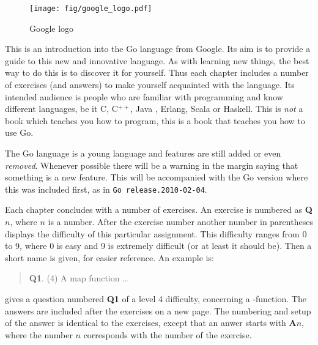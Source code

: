 \begin{wrapfigure}{r}{30mm}
\caption{Google logo}
\begin{center}
\texttt{[image: fig/google\_logo.pdf]}
\end{center}
\end{wrapfigure}
This is an introduction into the Go language from Google. Its aim
is to provide a guide to this new and innovative language. As with
learning new things, the best way to do this is to discover it for
yourself. Thus each chapter includes a number of exercises (and answers)
to make yourself acquainted with the language.
Its intended audience is people who are familiar with programming
and know different languages, be it C\cite{c}, C$^{++}$\cite{c++}, 
Java \cite{java}, Erlang\cite{erlang}, Scala\cite{scala} or
Haskell\cite{haskell}. This is \emph{not} a book which teaches you how to 
program, this is a book that teaches you how to use Go.

\begin{lbar}
\noindent The Go language is a young language and
features are still added or even \emph{removed}. Whenever
possible there will be a warning in the margin saying that
something is a new feature. This will be accompanied with
the Go version where this was included first, as in
\texttt{\tiny{}Go release.2010-02-04}.
\end{lbar}

Each chapter concludes with a number of exercises. An exercise
is numbered as \textbf{Q$n$}, where $n$ is a number. After the
exercise number another number in parentheses displays the difficulty
of this particular assignment. This difficulty ranges from 0 to 9, where
0 is easy and 9 is extremely difficult (or at least it should be).
Then a short name is given, for easier reference.
An example is:
\begin{verse}
\textbf{Q1}. (4) A map function \ldots
\end{verse}
    
\noindent gives a question numbered \textbf{Q1} of a level 4 difficulty, concerning a
-function. The answers are included after the exercises on a
new page.
The numbering and setup of the answer is identical to the
exercises, except that an anwer starts with \textbf{A$n$}, where the
number $n$ corresponds with the number of the exercise.

